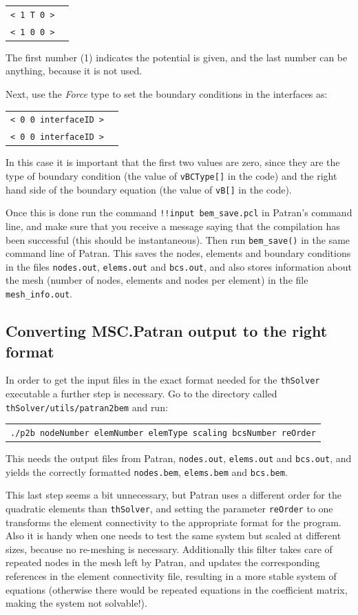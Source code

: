 \documentclass[12pt]{article}
\begin{document}
\begin{tabular}{ll}
\texttt{< 1 T 0 >}\\
\texttt{< 1 0 0 >}
\end{tabular}

The first number (1) indicates the potential is given, and the last number can be anything, because it is not used.

Next, use the {\it Force} type to set the boundary conditions in the interfaces as:

\begin{tabular}{ll}
\texttt{< 0 0 interfaceID >}\\
\texttt{< 0 0 interfaceID >}
\end{tabular}

In this case it is important that the first two values are zero, since they are the type of boundary condition (the value of \verb+vBCType[]+ in the code) and the right hand side  of the boundary equation (the value of \verb+vB[]+ in the code).

Once this is done run the command \verb+!!input bem_save.pcl+ in Patran's command line, and make sure that you receive a message saying that the compilation has been successful (this should be instantaneous). Then run \verb+bem_save()+ in the same command line of Patran. This saves the nodes, elements and boundary conditions in the files \verb+nodes.out+, \verb+elems.out+ and \verb+bcs.out+, and also stores information about the mesh (number of nodes, elements and nodes per element) in the file \verb+mesh_info.out+.

\subsection{Converting MSC.Patran output to the right format}
In order to get the input files in the exact format needed for the \verb+thSolver+ executable a further step is necessary. Go to the directory called \verb+thSolver/utils/patran2bem+ and run:

\begin{tabular}{l}
\texttt{./p2b nodeNumber elemNumber elemType scaling bcsNumber reOrder}
\end{tabular}

This needs the output files from Patran, \verb+nodes.out+, \verb+elems.out+ and \verb+bcs.out+, and yields the correctly formatted \verb+nodes.bem+, \verb+elems.bem+ and \verb+bcs.bem+.

This last step seems a bit unnecessary, but Patran uses a different order for the quadratic elements than \verb+thSolver+, and setting the parameter \verb+reOrder+ to one transforms the element connectivity to the appropriate format for the program. Also it is handy when one needs to test the same system but scaled at different sizes, because no re-meshing is necessary. Additionally  this filter takes care of repeated nodes in the mesh left by Patran, and updates the corresponding references in the element connectivity file, resulting in a more stable system of equations (otherwise there would be repeated equations in the coefficient matrix, making the system not solvable!).
\end{document}

